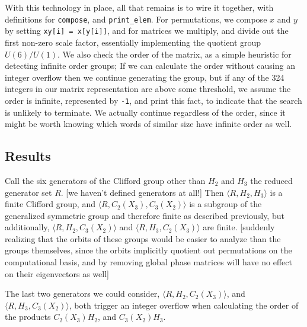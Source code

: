With this technology in place, all that remains is to wire it together, with definitions for \verb`compose`, and \verb`print_elem`. For permutations, we compose $x$ and $y$ by setting \verb`xy[i] = x[y[i]]`, and for matrices we multiply, and divide out the first non-zero scale factor, essentially implementing the quotient group $U(6)/U(1)$. We also check the order of the matrix, as a simple heuristic for detecting infinite order groups; If we can calculate the order without causing an integer overflow then we continue generating the group, but if any of the 324 integers in our matrix representation are above some threshold, we assume the order is infinite, represented by \verb`-1`, and print this fact, to indicate that the search is unlikely to terminate. We actually continue regardless of the order, since it might be worth knowing which words of similar size have infinite order as well.

\subsection{Results}
Call the six generators of the Clifford group other than $H_2$ and $H_3$ the reduced generator set $R$. [we haven't defined generators at all!] Then $\langle R, H_2, H_3 \rangle$ is a finite Clifford group, and $\langle R, C_2(X_3), C_3(X_2) \rangle$ is a subgroup of the generalized symmetric group and therefore finite as described previously, but additionally, $\langle R, H_2, C_3(X_2)\rangle$ and $\langle R, H_3, C_2(X_3)\rangle$ are finite. [suddenly realizing that the orbits of these groups would be easier to analyze than the groups themselves, since the orbits implicitly quotient out permutations on the computational basis, and by removing global phase matrices will have no effect on their eigenvectors as well]

The last two generators we could consider, $\langle R, H_2, C_2(X_3)\rangle$, and $\langle R, H_3, C_3(X_2)\rangle$, both trigger an integer overflow when calculating the order of the products $C_2(X_3)H_2$, and $C_3(X_2)H_3$.

